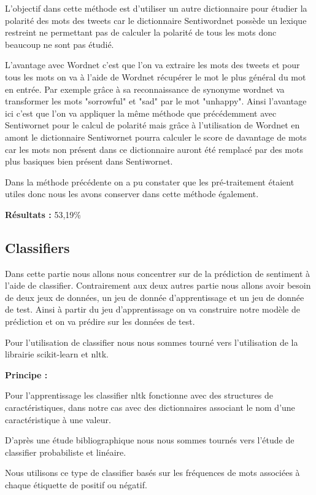 \par L'objectif dans cette méthode est d'utiliser un autre dictionnaire pour étudier la polarité des mots des tweets car le dictionnaire Sentiwordnet possède un lexique restreint ne permettant pas de calculer la polarité de tous les mots donc beaucoup ne sont pas étudié. \\

\par L'avantage avec Wordnet c'est que l'on va extraire les mots des tweets et pour tous les mots on va à l'aide de Wordnet récupérer le mot le plus général du mot en entrée. Par exemple grâce à sa reconnaissance de synonyme wordnet va transformer les mots "sorrowful" et "sad" par le mot "unhappy". Ainsi l'avantage ici c'est que l'on va appliquer la même méthode que précédemment avec Sentiwornet pour le calcul de polarité mais grâce à l'utilisation de Wordnet en amont le dictionnaire Sentiwornet pourra calculer le score de davantage de mots car les mots non présent dans ce dictionnaire auront été remplacé par des mots plus basiques bien présent dans Sentiwornet. \\

\par Dans la méthode précédente on a pu constater que les pré-traitement étaient utiles donc nous les avons conserver dans cette méthode également. \\

\par\textbf{ Résultats : } 53,19\%

\subsection{Classifiers}

\par Dans cette partie nous allons nous concentrer sur de la prédiction de sentiment à l'aide de classifier. Contrairement aux deux autres partie nous allons avoir besoin de deux jeux de données, un jeu de donnée d'apprentissage et un jeu de donnée de test. Ainsi à partir du jeu d'apprentissage on va construire notre modèle de prédiction et on va prédire sur les données de test. \\

\par Pour l'utilisation de classifier nous nous sommes tourné vers l'utilisation de la librairie scikit-learn et nltk. \\

\par \textbf{Principe : } \\
\par Pour l'apprentissage les classifier nltk fonctionne avec des structures de caractéristiques, dans notre cas avec des dictionnaires associant le nom d'une caractéristique à une valeur.
\par D'après une étude bibliographique nous nous sommes tournés vers l'étude de classifier probabiliste et linéaire.
\par Nous utilisons ce type de classifier basés sur les fréquences de mots associées à chaque étiquette de positif ou négatif. \\

